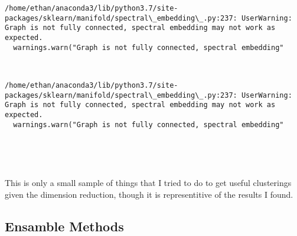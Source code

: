 \documentclass[11pt]{article}
\begin{document}
    \begin{Verbatim}[commandchars=\\\{\}]
/home/ethan/anaconda3/lib/python3.7/site-packages/sklearn/manifold/spectral\_embedding\_.py:237: UserWarning: Graph is not fully connected, spectral embedding may not work as expected.
  warnings.warn("Graph is not fully connected, spectral embedding"

    \end{Verbatim}

    \begin{center}
    \end{center}
    { \hspace*{\fill} \\}
    
    \begin{Verbatim}[commandchars=\\\{\}]
/home/ethan/anaconda3/lib/python3.7/site-packages/sklearn/manifold/spectral\_embedding\_.py:237: UserWarning: Graph is not fully connected, spectral embedding may not work as expected.
  warnings.warn("Graph is not fully connected, spectral embedding"

    \end{Verbatim}

    \begin{center}
    \end{center}
    { \hspace*{\fill} \\}
    
    \begin{center}
    \end{center}
    { \hspace*{\fill} \\}
    
    This is only a small sample of things that I tried to do to get useful
clusterings given the dimension reduction, though it is representitive
of the results I found.

    \hypertarget{ensamble-methods}{%
\subsection{Ensamble Methods}\label{ensamble-methods}}
\end{document}
